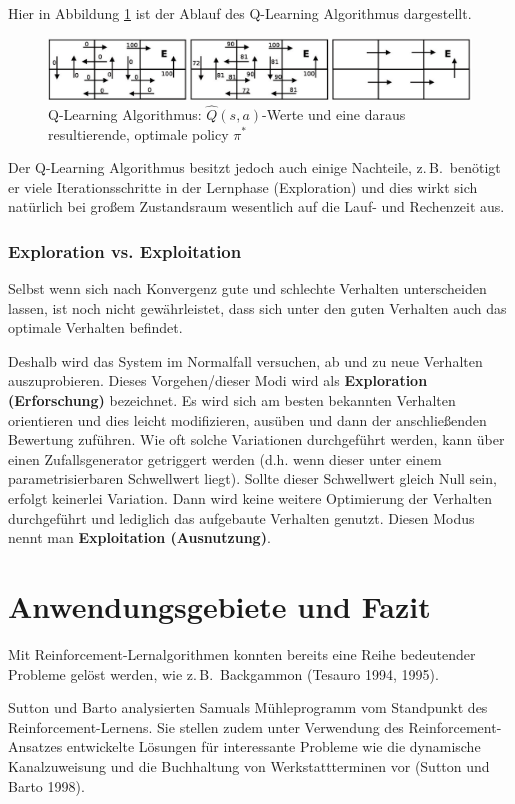 Hier in Abbildung \ref{fig:Beispiel-QLearning} ist der Ablauf des Q-Learning 
Algorithmus dargestellt.

\begin{figure}
	\centering
	\includegraphics[width=1.0\textwidth]{../images/Q_Policy.eps}
	\caption{Q-Learning Algorithmus: $\hat{Q}(s,a)$-Werte und eine daraus 
	resultierende, optimale policy $\pi^*$}
	\label{fig:Beispiel-QLearning}
\end{figure}

Der Q-Learning Algorithmus besitzt jedoch auch einige Nachteile, z.\,B.\ 
benötigt er viele Iterationsschritte in der Lernphase (Exploration) und dies 
wirkt sich natürlich bei großem Zustandsraum wesentlich auf die Lauf- und Rechenzeit aus.

\subsubsection{Exploration vs. Exploitation}
Selbst wenn sich nach Konvergenz gute und schlechte Verhalten unterscheiden 
lassen, ist noch nicht gewährleistet, dass sich unter den guten Verhalten auch 
das optimale Verhalten befindet. \par Deshalb wird das System im Normalfall 
versuchen, ab und zu neue Verhalten auszuprobieren. Dieses Vorgehen/dieser Modi 
wird als \textbf{Exploration (Erforschung)} bezeichnet. Es wird sich am besten 
bekannten Verhalten orientieren und dies leicht modifizieren, ausüben und dann 
der anschließenden Bewertung zuführen. Wie oft solche Variationen durchgeführt 
werden, kann über einen Zufallsgenerator getriggert werden (d.h. wenn dieser 
unter einem parametrisierbaren Schwellwert liegt). Sollte dieser Schwellwert 
gleich Null sein, erfolgt keinerlei Variation. Dann wird keine weitere 
Optimierung der Verhalten durchgeführt und lediglich das aufgebaute Verhalten 
genutzt. Diesen Modus nennt man \textbf{Exploitation (Ausnutzung)}.

\section{Anwendungsgebiete und Fazit}
Mit Reinforcement-Lernalgorithmen konnten bereits eine Reihe bedeutender 
Probleme gelöst werden, wie z.\,B.\ Backgammon (Tesauro 1994, 1995). \par 
Sutton und Barto analysierten Samuals Mühleprogramm vom Standpunkt des 
Re\-in\-force\-ment-Lernens. Sie stellen zudem unter Verwendung des 
Reinforcement-Ansatzes entwickelte Lösungen für interessante Probleme wie die 
dynamische Kanalzuweisung und die Buchhaltung von Werkstattterminen vor (Sutton 
und Barto 1998).

